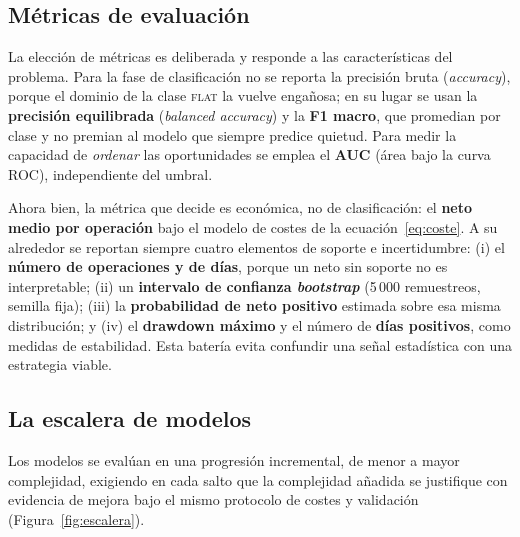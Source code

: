 \subsection{Métricas de evaluación}

La elección de métricas es deliberada y responde a las características del problema. Para la
fase de clasificación no se reporta la precisión bruta (\emph{accuracy}), porque el dominio
de la clase \textsc{flat} la vuelve engañosa; en su lugar se usan la \textbf{precisión
equilibrada} (\emph{balanced accuracy}) y la \textbf{F1 macro}, que promedian por clase y no
premian al modelo que siempre predice quietud. Para medir la capacidad de \emph{ordenar} las
oportunidades se emplea el \textbf{AUC} (área bajo la curva ROC), independiente del umbral.

Ahora bien, la métrica que decide es económica, no de clasificación: el \textbf{neto medio
por operación} bajo el modelo de costes de la ecuación~\eqref{eq:coste}. A su alrededor se
reportan siempre cuatro elementos de soporte e incertidumbre: (i) el \textbf{número de
operaciones y de días}, porque un neto sin soporte no es interpretable; (ii) un
\textbf{intervalo de confianza \emph{bootstrap}} (5\,000 remuestreos, semilla fija); (iii) la
\textbf{probabilidad de neto positivo} estimada sobre esa misma distribución; y (iv) el
\textbf{drawdown máximo} y el número de \textbf{días positivos}, como medidas de estabilidad.
Esta batería evita confundir una señal estadística con una estrategia viable.

\subsection{La escalera de modelos}

Los modelos se evalúan en una progresión incremental, de menor a mayor complejidad,
exigiendo en cada salto que la complejidad añadida se justifique con evidencia de mejora
bajo el mismo protocolo de costes y validación (Figura~\ref{fig:escalera}).

